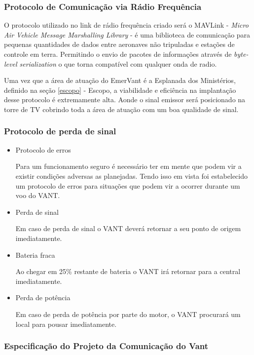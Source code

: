 \subsubsection{Protocolo de Comunicação via Rádio Frequência}

O protocolo utilizado no link de rádio frequência criado será o MAVLink - \textit{Micro Air Vehicle Message Marshalling Library} - é uma biblioteca de comunicação para 
pequenas quantidades de dados entre aeronaves não tripuladas e estações de controle em terra. 
Permitindo o envio de pacotes de informações através de \textit{byte-level serialization} o que torna 
compatível com qualquer onda de radio.\cite{mavlink}

Uma vez que a área de atuação do EmerVant é a Esplanada dos Ministérios, 
definido na seção \ref{escopo} - Escopo, a viabilidade e eficiência na implantação desse protocolo é
extremamente alta. Aonde o sinal emissor será posicionado na torre de TV cobrindo toda a 
área de atuação com um boa qualidade de sinal. 

\subsubsection{Protocolo de perda de sinal}

\begin{itemize}
  \item Protocolo de erros

  Para um funcionamento seguro é necessário ter em mente que podem vir a existir condições adversas as planejadas. Tendo isso em vista foi estabelecido um protocolo de erros para situações que podem vir a ocorrer durante um voo do VANT.

  \item Perda de sinal
  
  Em caso de perda de sinal o VANT deverá retornar a seu ponto de origem imediatamente.

  \item Bateria fraca

  Ao chegar em 25\% restante de bateria o VANT irá retornar para a central imediatamente.

  \item Perda de potência

  Em caso de perda de potência por parte do motor, o VANT procurará um local para pousar imediatamente.
\end{itemize}

\subsubsection{Especificação do Projeto da Comunicação do Vant}

